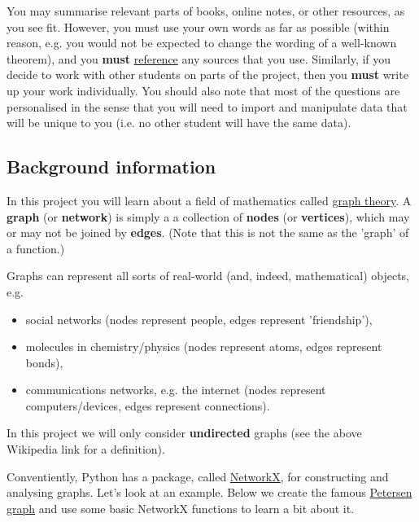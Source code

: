 \documentclass[11pt]{article}
\providecommand{\tightlist}{%
      \setlength{\itemsep}{0pt}\setlength{\parskip}{0pt}}
\begin{document}
You may summarise relevant parts of books, online notes, or other
resources, as you see fit. However, you must use your own words as far
as possible (within reason, e.g. you would not be expected to change the
wording of a well-known theorem), and you \textbf{must}
\href{https://qmplus.qmul.ac.uk/mod/book/view.php?id=807735\&chapterid=87793}{reference}
any sources that you use. Similarly, if you decide to work with other
students on parts of the project, then you \textbf{must} write up your
work individually. You should also note that most of the questions are
personalised in the sense that you will need to import and manipulate
data that will be unique to you (i.e. no other student will have the
same data).

    \subsection{Background information}\label{background-information}

In this project you will learn about a field of mathematics called
\href{https://en.wikipedia.org/wiki/Graph_theory}{graph theory}. A
\textbf{graph} (or \textbf{network}) is simply a a collection of
\textbf{nodes} (or \textbf{vertices}), which may or may not be joined by
\textbf{edges}. (Note that this is not the same as the 'graph' of a
function.)

Graphs can represent all sorts of real-world (and, indeed, mathematical)
objects, e.g.

\begin{itemize}
\tightlist
\item
  social networks (nodes represent people, edges represent
  'friendship'),
\item
  molecules in chemistry/physics (nodes represent atoms, edges represent
  bonds),
\item
  communications networks, e.g. the internet (nodes represent
  computers/devices, edges represent connections).
\end{itemize}

In this project we will only consider \textbf{undirected} graphs (see
the above Wikipedia link for a definition).

Conventiently, Python has a package, called
\href{https://networkx.github.io/}{NetworkX}, for constructing and
analysing graphs. Let's look at an example. Below we create the famous
\href{https://en.wikipedia.org/wiki/Petersen_graph}{Petersen graph} and
use some basic NetworkX functions to learn a bit about it.
\end{document}
